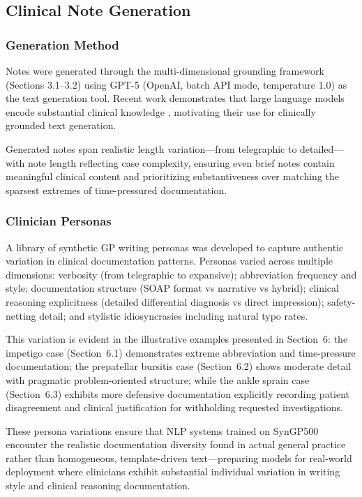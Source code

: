 \documentclass[11pt]{article}
\begin{document}
\subsection{Clinical Note Generation}

\subsubsection{Generation Method}
Notes were generated through the multi-dimensional grounding framework (Sections 3.1--3.2) using GPT-5 (OpenAI, batch API mode, temperature 1.0) as the text generation tool. Recent work demonstrates that large language models encode substantial clinical knowledge \cite{singhal2023}, motivating their use for clinically grounded text generation.

Generated notes span realistic length variation—from telegraphic to detailed—with note length reflecting case complexity, ensuring even brief notes contain meaningful clinical content and prioritizing substantiveness over matching the sparsest extremes of time-pressured documentation.

\subsubsection{Clinician Personas}
A library of synthetic GP writing personas was developed to capture authentic variation in clinical documentation patterns. Personas varied across multiple dimensions: verbosity (from telegraphic to expansive); abbreviation frequency and style; documentation structure (SOAP format vs narrative vs hybrid); clinical reasoning explicitness (detailed differential diagnosis vs direct impression); safety-netting detail; and stylistic idiosyncrasies including natural typo rates.

This variation is evident in the illustrative examples presented in Section~6: the impetigo case (Section~6.1) demonstrates extreme abbreviation and time-pressure documentation; the prepatellar bursitis case (Section~6.2) shows moderate detail with pragmatic problem-oriented structure; while the ankle sprain case (Section~6.3) exhibits more defensive documentation explicitly recording patient disagreement and clinical justification for withholding requested investigations.

These persona variations ensure that NLP systems trained on SynGP500 encounter the realistic documentation diversity found in actual general practice rather than homogeneous, template-driven text—preparing models for real-world deployment where clinicians exhibit substantial individual variation in writing style and clinical reasoning documentation.
\end{document}
